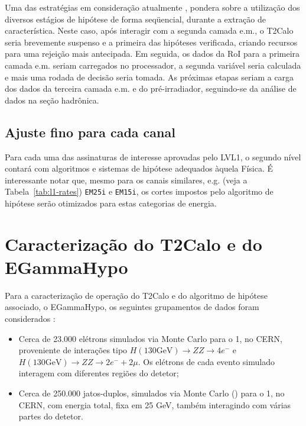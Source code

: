 Uma das estratégias em consideração atualmente \cite{t2calo-wiki}, pondera
sobre a utilização dos diversos estágios de hipótese de forma seqüencial,
durante a extração de característica. Neste caso, após interagir com a segunda
camada e.m., o T2Calo seria brevemente suspenso e a primeira das hipóteses
verificada, criando recursos para uma rejeição mais antecipada. Em seguida, os
dados da RoI para a primeira camada e.m. seriam carregados no processador, a
segunda variável seria calculada e mais uma rodada de decisão seria tomada. As
próximas etapas seriam a carga dos dados da terceira camada e.m. e do
pré-irradiador, seguindo-se da análise de dados na seção hadrônica.

\subsection{Ajuste fino para cada canal}

Para cada uma das assinaturas de interesse aprovadas pelo LVL1, o segundo
nível contará com algoritmos e sistemas de hipótese adequados àquela Física. É
interessante notar que, mesmo para os canais similares, e.g. (veja a
Tabela~\ref{tab:l1-rates}) \texttt{EM25i} e \texttt{EM15i}, os cortes impostos
pelo algoritmo de hipótese serão otimizados para estas categorias de energia.


\section{Caracterização do T2Calo e do EGammaHypo}
\label{sec:def-eghypo}

Para a caracterização de operação do T2Calo e do algoritmo de hipótese
associado, o EGammaHypo, os seguintes grupamentos de dados foram
considerados \cite{egamma-dc1-samples, validation-dc1-samples}:

\begin{itemize}
\item Cerca de 23.000 elétrons simulados via Monte Carlo para o  1, no CERN, proveniente de interações tipo $H (130
\text{GeV})\rightarrow ZZ
\rightarrow 4e^-$ e $H (130 \text{GeV})\rightarrow ZZ \rightarrow 2e^- +
2\mu$. Os elétrons de cada evento simulado interagem com diferentes regiões do
detetor;
\item Cerca de 250.000 jatos-duplos, simulados via Monte Carlo ()
para o  1, no CERN, com energia total, fixa em 25 GeV,
também interagindo com várias partes do detetor.
\end{itemize}

